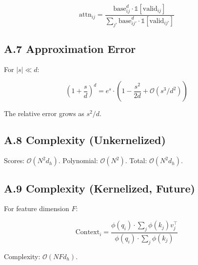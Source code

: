 \[
\text{attn}_{ij} = \frac{\text{base}_{ij}^d \cdot \mathbb{1}[\text{valid}_{ij}]}{\sum_{j'} \text{base}_{ij'}^d \cdot \mathbb{1}[\text{valid}_{ij'}]}
\tag{A.7}
\]

\subsection{A.7 Approximation Error}

For $|s| \ll d$:

\[
\left(1 + \frac{s}{d}\right)^d = e^s \cdot \left(1 - \frac{s^2}{2d} + \mathcal{O}(s^3/d^2)\right)
\tag{A.8}
\]

The relative error grows as $s^2/d$.

\subsection{A.8 Complexity (Unkernelized)}

Scores: $\mathcal{O}(N^2 d_h)$.
Polynomial: $\mathcal{O}(N^2)$.
Total: $\mathcal{O}(N^2 d_h)$.

\subsection{A.9 Complexity (Kernelized, Future)}

For feature dimension $F$:

\[
\text{Context}_i = \frac{\phi(q_i) \cdot \sum_j \phi(k_j) v_j^\top}{\phi(q_i) \cdot \sum_j \phi(k_j)}
\tag{A.9}
\]

Complexity: $\mathcal{O}(N F d_h)$.

